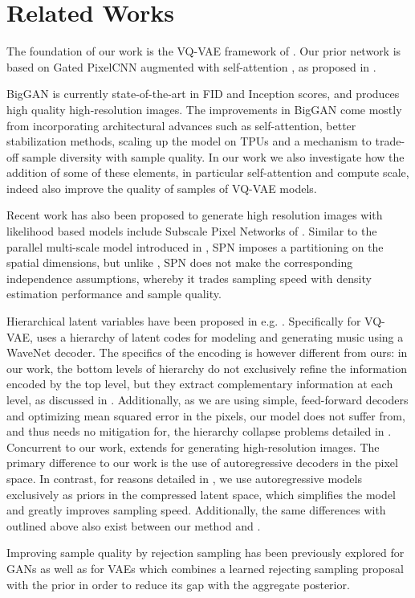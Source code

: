 \section{Related Works} \label{sec:rel}

The foundation of our work is the VQ-VAE framework of \cite{VQVAE}. Our prior network is based on Gated PixelCNN \cite{pixelcnn} augmented with self-attention \cite{Vaswani2017}, as proposed in \cite{PixelSnail}. 
\par
BigGAN \cite{biggan} is currently state-of-the-art in FID and Inception scores, and produces high quality high-resolution images. The improvements in BigGAN come mostly from incorporating architectural advances such as self-attention, better stabilization methods, scaling up the model on TPUs and a mechanism to trade-off sample diversity with sample quality. In our work we also investigate how the addition of some of these elements, in particular self-attention and compute scale, indeed also improve the quality of samples of VQ-VAE models.
\par
Recent work has also been proposed to generate high resolution images with likelihood based models include Subscale Pixel Networks of \cite{SPN}. Similar to the parallel multi-scale model introduced in \cite{reed2017parallel}, SPN imposes a partitioning on the spatial dimensions, but unlike \cite{reed2017parallel}, SPN does not make the corresponding independence assumptions, whereby it trades sampling speed with density estimation performance and sample quality.
\par
Hierarchical latent variables have been proposed in e.g. \cite{Rezende2014}. Specifically for VQ-VAE, \cite{Dieleman2018} uses a hierarchy of latent codes for modeling and
generating music using a WaveNet decoder. The specifics of the encoding is however different from ours: in our work, the bottom levels of hierarchy do not exclusively refine the information encoded by the top level, but they extract complementary information at each level, as discussed in . Additionally, as we are using simple, feed-forward decoders and optimizing mean squared error in the pixels, our model does not suffer from, and thus needs no mitigation for, the hierarchy collapse problems detailed in \cite{Dieleman2018}. Concurrent to our work, \cite{defauw2019} extends \cite{Dieleman2018} for generating high-resolution images. The primary difference to our work is the use of autoregressive decoders in the pixel space. In contrast, for reasons detailed in , we use autoregressive models exclusively as priors in the compressed latent space, which simplifies the model and greatly improves sampling speed. Additionally, the same differences with \cite{Dieleman2018} outlined above also exist between our method and \cite{defauw2019}.
\par
Improving sample quality by rejection sampling has been previously explored for GANs \cite{azadi2018discriminator} as well as for VAEs \cite{Bauer18} which combines a learned rejecting sampling proposal with the prior in order to reduce its gap with the aggregate posterior.